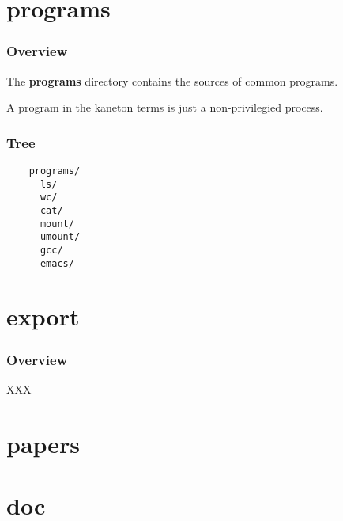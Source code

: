 \documentclass[8pt]{beamer}
\newcommand{\nl}[0]{\vspace{0.4cm}}
\begin{document}
\section{programs}


\begin{frame}
  \frametitle{Overview}

  The \textbf{programs} directory contains the sources of common
  programs.

  \nl

  A program in the kaneton terms is just a non-privilegied
  process.
\end{frame}


\begin{frame}[containsverbatim]
  \frametitle{Tree}

  \begin{verbatim}
    programs/
      ls/
      wc/
      cat/
      mount/
      umount/
      gcc/
      emacs/
  \end{verbatim}
\end{frame}

%
%

\section{export}


\begin{frame}
  \frametitle{Overview}

  XXX
\end{frame}

%
%

\section{papers}

%
%

\section{doc}
\end{document}

